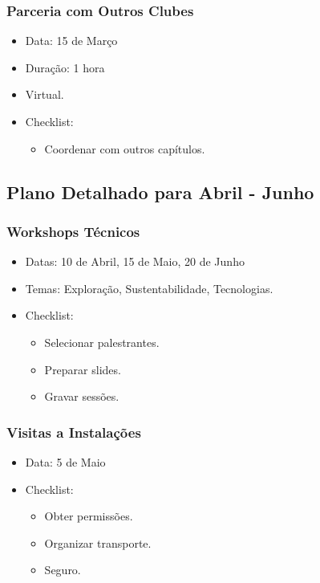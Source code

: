 \documentclass[12pt]{article}
\begin{document}
\subsubsection{Parceria com Outros Clubes}
\begin{itemize}
    \item Data: 15 de Março
    \item Duração: 1 hora
    \item Virtual.
    \item Checklist:
      \begin{itemize}
        \item Coordenar com outros capítulos.
      \end{itemize}
\end{itemize}

\subsection{Plano Detalhado para Abril - Junho}

\subsubsection{Workshops Técnicos}
\begin{itemize}
    \item Datas: 10 de Abril, 15 de Maio, 20 de Junho
    \item Temas: Exploração, Sustentabilidade, Tecnologias.
    \item Checklist:
      \begin{itemize}
        \item Selecionar palestrantes.
        \item Preparar slides.
        \item Gravar sessões.
      \end{itemize}
\end{itemize}

\subsubsection{Visitas a Instalações}
\begin{itemize}
    \item Data: 5 de Maio
    \item Checklist:
      \begin{itemize}
        \item Obter permissões.
        \item Organizar transporte.
        \item Seguro.
      \end{itemize}
\end{itemize}
\end{document}
